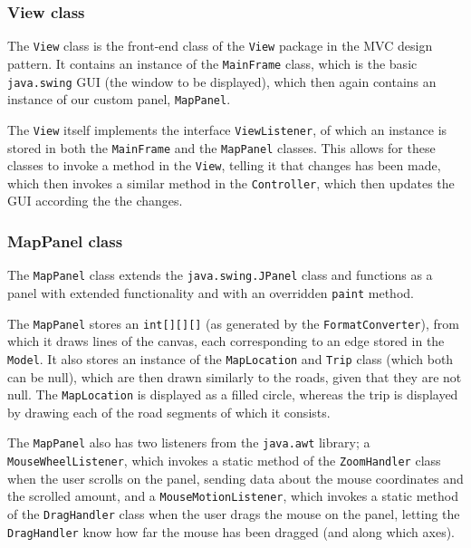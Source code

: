 \documentclass[a4paper,11pt]{article}
\begin{document}
\subsubsection{View class} %
The \texttt{View} class is the front-end class of the \texttt{View} package in the MVC design pattern. It contains an instance of the \texttt{MainFrame} class, which is the basic \texttt{java.swing} GUI (the window to be displayed), which then again contains an instance of our custom panel, \texttt{MapPanel}.

The \texttt{View} itself implements the interface \texttt{ViewListener}, of which an instance is stored in both the \texttt{MainFrame} and the \texttt{MapPanel} classes. This allows for these classes to invoke a method in the \texttt{View}, telling it that changes has been made, which then invokes a similar method in the \texttt{Controller}, which then updates the GUI according the the changes.

\subsubsection{MapPanel class} %
The \texttt{MapPanel} class extends the \texttt{java.swing.JPanel} class and functions as a panel with extended functionality and with an overridden \texttt{paint} method.

The \texttt{MapPanel} stores an \texttt{int[][][]} (as generated by the \texttt{FormatConverter}), from which it draws lines of the canvas, each corresponding to an edge stored in the \texttt{Model}. It also stores an instance of the \texttt{MapLocation} and \texttt{Trip} class (which both can be null), which are then drawn similarly to the roads, given that they are not null. The \texttt{MapLocation} is displayed as a filled circle, whereas the trip is displayed by drawing each of the road segments of which it consists.

The \texttt{MapPanel} also has two listeners from the \texttt{java.awt} library; a \\\texttt{MouseWheelListener}, which invokes a static method of the \texttt{ZoomHandler} class when the user scrolls on the panel, sending data about the mouse coordinates and the scrolled amount, and a \texttt{MouseMotionListener}, which invokes a static method of the \texttt{DragHandler} class when the user drags the mouse on the panel, letting the \texttt{DragHandler} know how far the mouse has been dragged (and along which axes).
\end{document}
